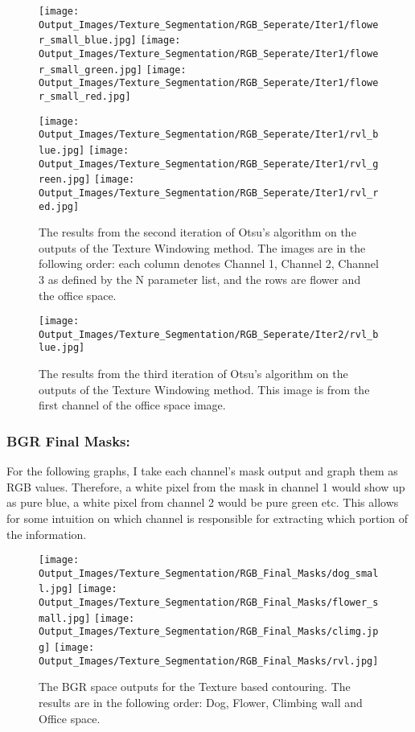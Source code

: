 \documentclass{article}
\begin{document}
\begin{figure}[H]
    \centering
    \texttt{[image: Output\_Images/Texture\_Segmentation/RGB\_Seperate/Iter1/flower\_small\_blue.jpg]}
    \texttt{[image: Output\_Images/Texture\_Segmentation/RGB\_Seperate/Iter1/flower\_small\_green.jpg]}
    \texttt{[image: Output\_Images/Texture\_Segmentation/RGB\_Seperate/Iter1/flower\_small\_red.jpg]}

    \texttt{[image: Output\_Images/Texture\_Segmentation/RGB\_Seperate/Iter1/rvl\_blue.jpg]}
    \texttt{[image: Output\_Images/Texture\_Segmentation/RGB\_Seperate/Iter1/rvl\_green.jpg]}
    \texttt{[image: Output\_Images/Texture\_Segmentation/RGB\_Seperate/Iter1/rvl\_red.jpg]}
    \caption{The results from the second iteration of Otsu's algorithm on the outputs of the Texture Windowing method. 
    The images are in the following order: each column denotes Channel 1, Channel 2, Channel 3 as defined by the N parameter list,
    and the rows are flower and the office space.}
\end{figure}

\begin{figure}[H]
    \centering
    \texttt{[image: Output\_Images/Texture\_Segmentation/RGB\_Seperate/Iter2/rvl\_blue.jpg]}
    \caption{The results from the third iteration of Otsu's algorithm on the outputs of the Texture Windowing method. 
    This image is from the first channel of the office space image.}
\end{figure}

\subsubsection{BGR Final Masks:}
For the following graphs, I take each channel's mask output and graph them as RGB values. Therefore, a white pixel from the mask in channel 1
would show up as pure blue, a white pixel from channel 2 would be pure green etc. This allows for some intuition on which channel is responsible 
for extracting which portion of the information.
\begin{figure}[H]
    \centering
    \texttt{[image: Output\_Images/Texture\_Segmentation/RGB\_Final\_Masks/dog\_small.jpg]}
    \texttt{[image: Output\_Images/Texture\_Segmentation/RGB\_Final\_Masks/flower\_small.jpg]}
    \texttt{[image: Output\_Images/Texture\_Segmentation/RGB\_Final\_Masks/climg.jpg]}
    \texttt{[image: Output\_Images/Texture\_Segmentation/RGB\_Final\_Masks/rvl.jpg]}
    \caption{The BGR space outputs for the Texture based contouring. The results are in the following order: Dog, Flower, Climbing wall and Office space.}
\end{figure}
\end{document}
